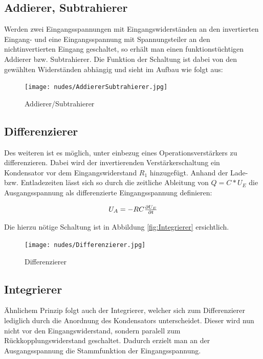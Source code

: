 \documentclass[12pt,a4paper,twoside]{article}
\begin{document}
\subsection{Addierer, Subtrahierer}

Werden zwei Eingangsspannungen mit Eingangswiderständen an den invertierten Eingang- und eine Eingangsspannung mit Spannungsteiler an den nichtinvertierten Eingang geschaltet, so erhält man einen funktionstüchtigen Addierer bzw. Subtrahierer.
Die Funktion der Schaltung ist dabei von den gewählten Widerständen abhängig und sieht im Aufbau wie folgt aus:

\begin{figure}[H]
    \centering
    \texttt{[image: nudes/AddiererSubtrahierer.jpg]}
    \caption{Addierer/Subtrahierer \cite{teachcenter2}}
    \label{fig:AddiererSubtrahierer}
\end{figure}


\subsection{Differenzierer}

Des weiteren ist es möglich, unter einbezug eines Operationsverstärkers zu differenzieren. Dabei wird der invertierenden Verstärkerschaltung ein Kondensator vor dem Eingangswiderstand $R_{1}$ hinzugefügt. Anhand der Lade- bzw. Entladezeiten lässt sich so durch die zeitliche Ableitung von $Q = C*U_{E}$ die Ausgangsspannung als differenzierte Eingangsspannung definieren:

\begin{equation}
    \label{eq:DifferenziererAusgang}
    \centerline{$U_{A}=-RC \frac{\partial U_{E}}{\partial t}$}
\end{equation}

\noindent
Die hierzu nötige Schaltung ist in Abbildung \ref{fig:Integrierer} ersichtlich.

\begin{figure}[H]
    \centering
    \texttt{[image: nudes/Differenzierer.jpg]}
    \caption{Differenzierer \cite{teachcenter2}}
    \label{fig:Differenzierer}
\end{figure}


\subsection{Integrierer}

Ähnlichem Prinzip folgt auch der Integrierer, welcher sich zum Differenzierer lediglich durch die Anordnung des Kondensators unterscheidet. Dieser wird nun nicht vor den Eingangswiderstand, sondern paralell zum Rückkopplungswiderstand geschaltet.
Dadurch erzielt man an der Ausgangsspannung die Stammfunktion der Eingangsspannung.
\end{document}
